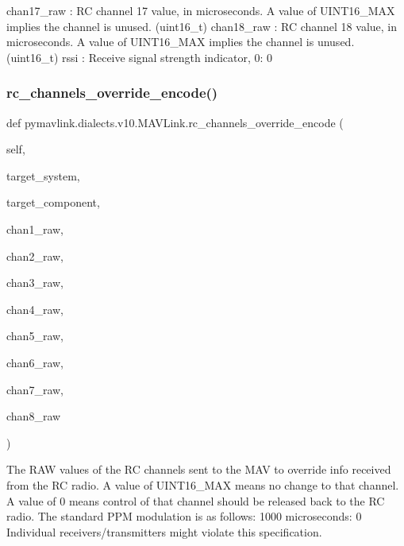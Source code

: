 \begin{DoxyVerb}
\begin{DoxyVerb}
\begin{DoxyVerb}
\begin{DoxyVerb}
\begin{DoxyVerb}
chan17_raw                : RC channel 17 value, in microseconds. A value of UINT16_MAX implies the channel is unused. (uint16_t)
chan18_raw                : RC channel 18 value, in microseconds. A value of UINT16_MAX implies the channel is unused. (uint16_t)
rssi                      : Receive signal strength indicator, 0: 0%
 \mbox{\label{classpymavlink_1_1dialects_1_1v10_1_1MAVLink_ae06404060634f3fd475d65af2bd1cd11}} 
\subsubsection{\texorpdfstring{rc\+\_\+channels\+\_\+override\+\_\+encode()}{rc\_channels\_override\_encode()}}
{\footnotesize\ttfamily def pymavlink.\+dialects.\+v10.\+M\+A\+V\+Link.\+rc\+\_\+channels\+\_\+override\+\_\+encode (\begin{DoxyParamCaption}\item[{}]{self,  }\item[{}]{target\+\_\+system,  }\item[{}]{target\+\_\+component,  }\item[{}]{chan1\+\_\+raw,  }\item[{}]{chan2\+\_\+raw,  }\item[{}]{chan3\+\_\+raw,  }\item[{}]{chan4\+\_\+raw,  }\item[{}]{chan5\+\_\+raw,  }\item[{}]{chan6\+\_\+raw,  }\item[{}]{chan7\+\_\+raw,  }\item[{}]{chan8\+\_\+raw }\end{DoxyParamCaption})}

\begin{DoxyVerb}The RAW values of the RC channels sent to the MAV to override info
received from the RC radio. A value of UINT16_MAX
means no change to that channel. A value of 0 means
control of that channel should be released back to the
RC radio. The standard PPM modulation is as follows:
1000 microseconds: 0%
Individual receivers/transmitters might violate this
specification.


\end{DoxyVerb}
\end{DoxyVerb}
\end{DoxyVerb}
\end{DoxyVerb}
\end{DoxyVerb}
\end{DoxyVerb}
